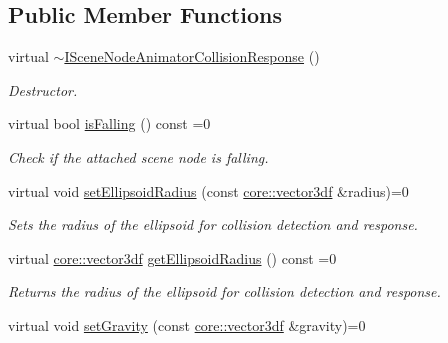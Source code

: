 \subsection*{Public Member Functions}
\begin{DoxyCompactItemize}
\item 
\mbox{\label{classirr_1_1scene_1_1ISceneNodeAnimatorCollisionResponse_ab6b85fb4f76e2d0c03cf2c6b326bddde}} 
virtual \hyperlink{classirr_1_1scene_1_1ISceneNodeAnimatorCollisionResponse_ab6b85fb4f76e2d0c03cf2c6b326bddde}{$\sim$\+I\+Scene\+Node\+Animator\+Collision\+Response} ()
\begin{DoxyCompactList}\small\item\em Destructor. \end{DoxyCompactList}\item 
virtual bool \hyperlink{classirr_1_1scene_1_1ISceneNodeAnimatorCollisionResponse_a66f5534c1d2ac0e2ea52e7b21a3c91d7}{is\+Falling} () const =0
\begin{DoxyCompactList}\small\item\em Check if the attached scene node is falling. \end{DoxyCompactList}\item 
virtual void \hyperlink{classirr_1_1scene_1_1ISceneNodeAnimatorCollisionResponse_a71af73590016ba936340a79467690d3f}{set\+Ellipsoid\+Radius} (const \hyperlink{namespaceirr_1_1core_a06f169d08b5c429f5575acb7edbad811}{core\+::vector3df} \&radius)=0
\begin{DoxyCompactList}\small\item\em Sets the radius of the ellipsoid for collision detection and response. \end{DoxyCompactList}\item 
virtual \hyperlink{namespaceirr_1_1core_a06f169d08b5c429f5575acb7edbad811}{core\+::vector3df} \hyperlink{classirr_1_1scene_1_1ISceneNodeAnimatorCollisionResponse_a92965919db3dfbaab2d1f4987a2c52c1}{get\+Ellipsoid\+Radius} () const =0
\begin{DoxyCompactList}\small\item\em Returns the radius of the ellipsoid for collision detection and response. \end{DoxyCompactList}\item 
virtual void \hyperlink{classirr_1_1scene_1_1ISceneNodeAnimatorCollisionResponse_af366695a82153c144b58c65cb4d092f3}{set\+Gravity} (const \hyperlink{namespaceirr_1_1core_a06f169d08b5c429f5575acb7edbad811}{core\+::vector3df} \&gravity)=0

\end{DoxyCompactItemize}
